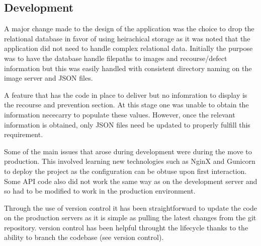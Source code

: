   \subsection{Development}
    A major change made to the design of the application was the choice to drop the relational database in favor of using heirachical storage as it was noted that the application did not need to handle complex relational data. Initially the purpose was to have the database handle filepaths to images and recourse/defect information but this was easily handled with consistent directory naming on the image server and JSON files.
    \par
    A feature that has the code in place to deliver but no infomration to display is the recourse and prevention section. At this stage one was unable to obtain the information nececarry to populate these values. However, once the relevant information is obtained, only JSON files need be updated to properly fulfill this requirement.
    \par
    Some of the main issues that arose during development were during the move to production. This involved learning new technologies such as NginX and Gunicorn to deploy the project as the configuration can be obtuse upon first interaction. Some API code also did not work the same way as on the development server and so had to be modified to work in the production environment.
    \par
    Through the use of version control it has been straightforward to update the code on the production servers as it is simple as pulling the latest changes from the git repository. version control has been helpful throught the lifecycle thanks to the ability to branch the codebase (see version control).
    \par
